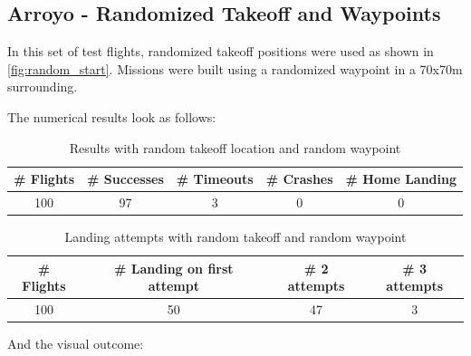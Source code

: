     \subsection{Arroyo - Randomized Takeoff and Waypoints}

    In this set of test flights, randomized takeoff positions were used as shown in \cref{fig:random_start}. Missions were built using a randomized waypoint in a 70x70m surrounding.

    The numerical results look as follows:

    \begin{table}[h]
        \begin{center}
         \caption{Results with random takeoff location and random waypoint}\vspace{1ex}
         \label{tab:result_complete_rand}
         \begin{tabular}{|c|c|c|c|c|}
         \hline
         \# Flights & \# Successes & \# Timeouts & \# Crashes & \# Home Landing\\ \hline \hline
         100 & 97 & 3 & 0 & 0 \\%
         \hline
         \end{tabular}
        \end{center}
    \end{table}
    \begin{table}[h]
        \begin{center}
         \caption{Landing attempts with random takeoff and random waypoint}\vspace{1ex}
         \label{tab:land_nums_complete_rand}
         \begin{tabular}{|c|c|c|c|}
         \hline
         \# Flights & \# Landing on first attempt & \# 2 attempts & \# 3 attempts\\ \hline \hline
         100 & 50 & 47 & 3 \\%
         \hline
         \end{tabular}
        \end{center}
    \end{table}

    And the visual outcome:

